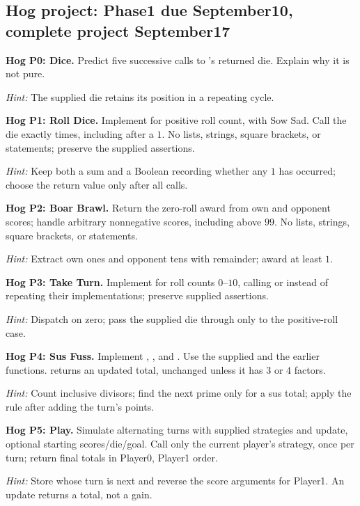 \subsection{Hog project: Phase1 due September10, complete project September17}
\begin{prob}
\textbf{Hog P0: Dice.} Predict five successive calls to 's returned die. Explain why it is not pure.\par
\emph{Hint:} The supplied die retains its position in a repeating cycle.
\end{prob}
\begin{prob}
\textbf{Hog P1: Roll Dice.} Implement  for positive roll count, with Sow Sad. Call the die exactly  times, including after a $1$. No lists, strings, square brackets, or  statements; preserve the supplied assertions.\par
\emph{Hint:} Keep both a sum and a Boolean recording whether any $1$ has occurred; choose the return value only after all calls.
\end{prob}
\begin{prob}
\textbf{Hog P2: Boar Brawl.} Return the zero-roll award from own and opponent scores; handle arbitrary nonnegative scores, including above $99$. No lists, strings, square brackets, or  statements.\par
\emph{Hint:} Extract own ones and opponent tens with remainder; award at least $1$.
\end{prob}
\begin{prob}
\textbf{Hog P3: Take Turn.} Implement  for roll counts $0$--$10$, calling  or  instead of repeating their implementations; preserve supplied assertions.\par
\emph{Hint:} Dispatch on zero; pass the supplied die through only to the positive-roll case.
\end{prob}
\begin{prob}
\textbf{Hog P4: Sus Fuss.} Implement , , and . Use the supplied  and the earlier functions.  returns an updated total, unchanged unless it has $3$ or $4$ factors.\par
\emph{Hint:} Count inclusive divisors; find the next prime only for a sus total; apply the rule after adding the turn's points.
\end{prob}
\begin{prob}
\textbf{Hog P5: Play.} Simulate alternating turns with supplied strategies and update, optional starting scores/die/goal. Call only the current player's strategy, once per turn; return final totals in Player0, Player1 order.\par
\emph{Hint:} Store whose turn is next and reverse the score arguments for Player1. An update returns a total, not a gain.
\end{prob}
